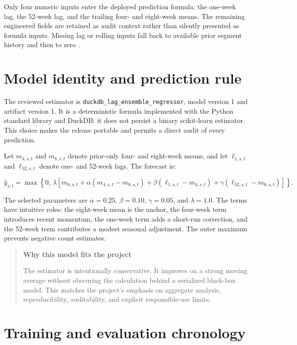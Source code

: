 \documentclass[11pt,oneside]{report}
\newenvironment{summarybox}[1][]
  {\begin{quote}\small\noindent\textbf{#1}\par\smallskip}
  {\end{quote}}
\begin{document}
Only four numeric inputs enter the deployed prediction formula: the one-week
lag, the 52-week lag, and the trailing four- and eight-week means. The remaining
engineered fields are retained as audit context rather than silently presented
as formula inputs. Missing lag or rolling inputs fall back to available prior
segment history and then to zero \cite{mlmanifest}.

\section{Model identity and prediction rule}

The reviewed estimator is \texttt{duckdb\_lag\_ensemble\_regressor}, model
version 1 and artifact version 1. It is a deterministic formula implemented
with the Python standard library and DuckDB; it does not persist a binary
scikit-learn estimator. This choice makes the release portable and permits a
direct audit of every prediction.

Let $m_{4,s,t}$ and $m_{8,s,t}$ denote prior-only four- and eight-week means,
and let $\ell_{1,s,t}$ and $\ell_{52,s,t}$ denote one- and 52-week lags. The
forecast is:

\begin{equation}
\widehat{y}_{s,t} = \max\left\{0,\,\lambda\left[
 m_{8,s,t}
 + \alpha(m_{4,s,t}-m_{8,s,t})
 + \beta(\ell_{1,s,t}-m_{4,s,t})
 + \gamma(\ell_{52,s,t}-m_{8,s,t})
\right]\right\}.
\label{eq:model}
\end{equation}

The selected parameters are $\alpha=0.25$, $\beta=0.10$, $\gamma=0.05$, and
$\lambda=1.0$. The terms have intuitive roles: the eight-week mean is the
anchor, the four-week term introduces recent momentum, the one-week term adds a
short-run correction, and the 52-week term contributes a modest seasonal
adjustment. The outer maximum prevents negative count estimates.

\begin{summarybox}[Why this model fits the project]
The estimator is intentionally conservative. It improves on a strong moving
average without obscuring the calculation behind a serialized black-box model.
This matches the project's emphasis on aggregate analysis, reproducibility,
auditability, and explicit responsible-use limits.
\end{summarybox}

\section{Training and evaluation chronology}
\end{document}
